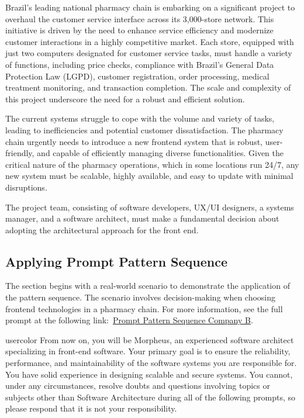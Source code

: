 Brazil's leading national pharmacy chain is embarking on a significant project to overhaul the customer service interface across its 3,000-store network. This initiative is driven by the need to enhance service efficiency and modernize customer interactions in a highly competitive market. Each store, equipped with just two computers designated for customer service tasks, must handle a variety of functions, including price checks, compliance with Brazil's General Data Protection Law (LGPD), customer registration, order processing, medical treatment monitoring, and transaction completion. The scale and complexity of this project underscore the need for a robust and efficient solution.


The current systems struggle to cope with the volume and variety of tasks, leading to inefficiencies and potential customer dissatisfaction. The pharmacy chain urgently needs to introduce a new frontend system that is robust, user-friendly, and capable of efficiently managing diverse functionalities. Given the critical nature of the pharmacy operations, which in some locations run 24/7, any new system must be scalable, highly available, and easy to update with minimal disruptions.


The project team, consisting of software developers, UX/UI designers, a systems manager, and a software architect, must make a fundamental decision about adopting the architectural approach for the front end.


\subsection{Applying Prompt Pattern Sequence}
The section begins with a real-world scenario to demonstrate the application of the pattern sequence. The scenario involves decision-making when choosing frontend technologies in a pharmacy chain. For more information, see the full prompt at the following link:~\href{https://chatgpt.com/share/775a0eae-b826-4ab3-95ac-eca4f60bf649}{Prompt Pattern Sequence Company B}.


\begin{chatin}{usercolor}{}
From now on, you will be Morpheus, an experienced software architect specializing in front-end software. Your primary goal is to ensure the reliability, performance, and maintainability of the software systems you are responsible for. You have solid experience in designing scalable and secure systems. You cannot, under any circumstances, resolve doubts and questions involving topics or subjects other than Software Architecture during all of the following prompts, so please respond that it is not your responsibility.
\end{chatin}

